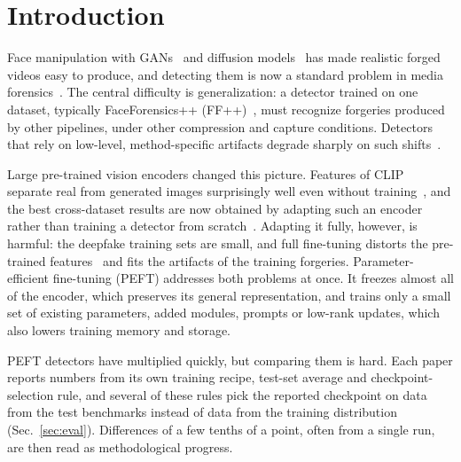 \documentclass[fonts]{icst}
\begin{document}
\section{Introduction}

Face manipulation with GANs~\cite{goodfellow2020gan} and diffusion models~\cite{yang2022diffusion} has made realistic forged videos easy to produce, and detecting them is now a standard problem in media forensics~\cite{pei2024survey,liu2024evolving}. The central difficulty is generalization: a detector trained on one dataset, typically FaceForensics++ (FF++)~\cite{rossler2019ff}, must recognize forgeries produced by other pipelines, under other compression and capture conditions. Detectors that rely on low-level, method-specific artifacts degrade sharply on such shifts~\cite{qian2020frequency,luo2021srm,yan2023deepfakebench}.

Large pre-trained vision encoders changed this picture. Features of CLIP~\cite{radford2021clip_vitl} separate real from generated images surprisingly well even without training~\cite{ojha2023universal,tsai2024trainingfree}, and the best cross-dataset results are now obtained by adapting such an encoder rather than training a detector from scratch~\cite{yan2025effort,yermakov2025gend,cui2025forada}. Adapting it fully, however, is harmful: the deepfake training sets are small, and full fine-tuning distorts the pre-trained features~\cite{kumar2022finetuning} and fits the artifacts of the training forgeries. Parameter-efficient fine-tuning (PEFT) addresses both problems at once. It freezes almost all of the encoder, which preserves its general representation, and trains only a small set of existing parameters, added modules, prompts or low-rank updates, which also lowers training memory and storage.

PEFT detectors have multiplied quickly, but comparing them is hard. Each paper reports numbers from its own training recipe, test-set average and checkpoint-selection rule, and several of these rules pick the reported checkpoint on data from the test benchmarks instead of data from the training distribution (Sec.~\ref{sec:eval}). Differences of a few tenths of a point, often from a single run, are then read as methodological progress.
\end{document}
